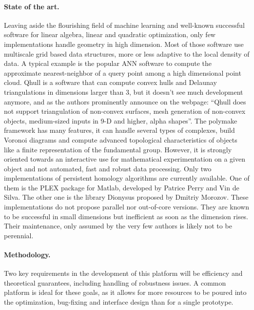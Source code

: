 \paragraph{ State of the art.}  
Leaving aside the flourishing field of machine learning
and well-known successful software for linear algebra,
linear and quadratic optimization,  only  few implementations handle
geometry in high dimension. 
Most of those software use multiscale  grid based
data structures,  more or less adaptive
 to the local  density of data.
A typical example is the popular ANN software to compute  the approximate
nearest-neighbor of a query point
among a  high dimensional point cloud. 
Qhull is a software that can compute convex hulls and Delaunay
triangulations in dimensions larger than 3, but it doesn't see much
development anymore, and as the authors prominently announce on the
webpage: ``Qhull does not support triangulation of non-convex surfaces,
mesh generation of non-convex objects, medium-sized inputs in 9-D and
higher, alpha shapes''. The polymake framework has many features,
it can handle several types of complexes, build Voronoi diagrams and
compute advanced topological characteristics of objects like a finite
representation of the fundamental group. However, it is strongly
oriented towards an interactive use for mathematical experimentation on
a given object and not automated, fast and robust data processing.
Only two implementations of persistent homology algorithms are
currently available. One of them is the PLEX package for Matlab,
developed by Patrice Perry and Vin de Silva. The other one is the
library Dionysus proposed by Dmitriy Morozov. These implementations
do not propose parallel nor out-of-core versions. They are known to be
successful in small dimensions but inefficient as soon as the
dimension rises.  Their  maintenance, only assumed by the very few authors
is likely not to be perennial.



\paragraph{ Methodology.} 
Two key requirements in the development of this platform will be
efficiency and theoretical guarantees, including handling of
robustness issues. A common
platform is ideal for these goals, as it allows for more
resources to be poured into the optimization, bug-fixing and interface
design than for a single prototype.

